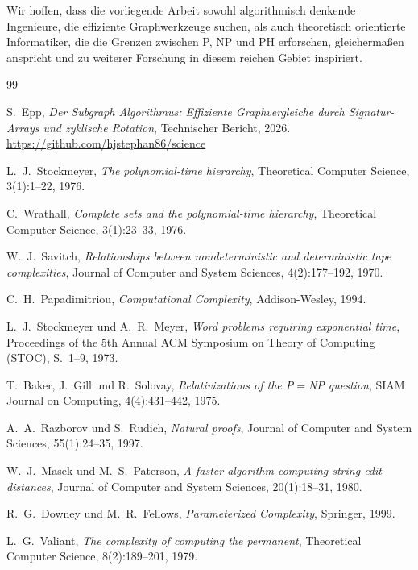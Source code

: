 ﻿\documentclass[a4paper,12pt]{article}
\theoremstyle{definition}
\begin{document}
Wir hoffen, dass die vorliegende Arbeit sowohl algorithmisch denkende Ingenieure,
die effiziente Graphwerkzeuge suchen, als auch theoretisch orientierte Informatiker,
die die Grenzen zwischen P, NP und PH erforschen, gleichermaßen anspricht und
zu weiterer Forschung in diesem reichen Gebiet inspiriert.

\newpage
\begin{thebibliography}{99}

  S.~Epp,
  \textit{Der Subgraph Algorithmus: Effiziente Graphvergleiche durch Signatur-Arrays
          und zyklische Rotation},
  Technischer Bericht, 2026.
  \url{https://github.com/hjstephan86/science}

  L.~J.~Stockmeyer,
  \textit{The polynomial-time hierarchy},
  Theoretical Computer Science, 3(1):1--22, 1976.

  C.~Wrathall,
  \textit{Complete sets and the polynomial-time hierarchy},
  Theoretical Computer Science, 3(1):23--33, 1976.

  W.~J.~Savitch,
  \textit{Relationships between nondeterministic and deterministic tape complexities},
  Journal of Computer and System Sciences, 4(2):177--192, 1970.

  C.~H.~Papadimitriou,
  \textit{Computational Complexity},
  Addison-Wesley, 1994.

  L.~J.~Stockmeyer und A.~R.~Meyer,
  \textit{Word problems requiring exponential time},
  Proceedings of the 5th Annual ACM Symposium on Theory of Computing (STOC),
  S.~1--9, 1973.

  T.~Baker, J.~Gill und R.~Solovay,
  \textit{Relativizations of the P$=$NP question},
  SIAM Journal on Computing, 4(4):431--442, 1975.

  A.~A.~Razborov und S.~Rudich,
  \textit{Natural proofs},
  Journal of Computer and System Sciences, 55(1):24--35, 1997.

  W.~J.~Masek und M.~S.~Paterson,
  \textit{A faster algorithm computing string edit distances},
  Journal of Computer and System Sciences, 20(1):18--31, 1980.

  R.~G.~Downey und M.~R.~Fellows,
  \textit{Parameterized Complexity},
  Springer, 1999.

  L.~G.~Valiant,
  \textit{The complexity of computing the permanent},
  Theoretical Computer Science, 8(2):189--201, 1979.


\end{thebibliography}
\end{document}
